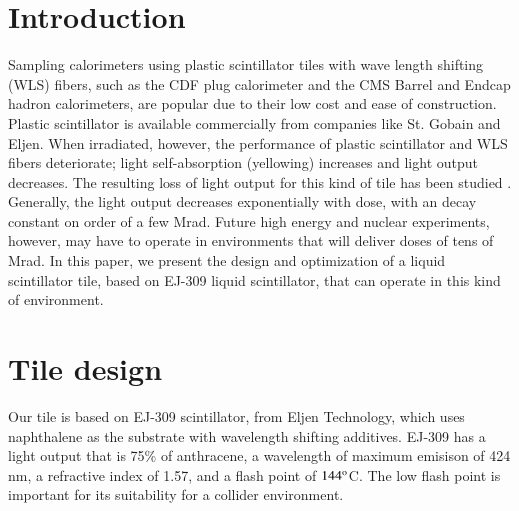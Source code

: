 \documentclass[review]{elsarticle}
\begin{document}
\linenumbers

\section{Introduction}
Sampling calorimeters using plastic scintillator tiles with wave length shifting (WLS) fibers, such as the CDF plug calorimeter \cite{Aota1995557}
and the CMS Barrel\cite{CMSHB} and Endcap\cite{HCALTDR1997} hadron calorimeters, are popular due to their low cost and ease of construction.  Plastic scintillator is available commercially from companies like St. Gobain and Eljen.  When irradiated, however, the performance of plastic scintillator and WLS fibers deteriorate; light self-absorption (yellowing) increases and light output decreases.  The resulting loss of light output for this kind of tile has been studied
\cite{vasken}\cite{ByonWagner1993263}.
Generally, the light output decreases exponentially with dose, with an decay constant on order of a few Mrad.  Future high energy and nuclear experiments, however, may have to operate in environments that will deliver doses of tens of Mrad.  In this paper, we present the design and optimization of a liquid scintillator tile, based on EJ-309 liquid scintillator, that can operate in this kind of environment.


\section{Tile design}

Our tile is based on EJ-309 scintillator, from Eljen Technology, which uses naphthalene as the substrate with wavelength shifting additives.  EJ-309 has a light output that is 75\% of anthracene, a wavelength of maximum emisison of 424 nm, a refractive index of 1.57, and a flash point of $\rm{144^o}$C.  The low flash point is important for its suitability for a collider environment.
\end{document}
